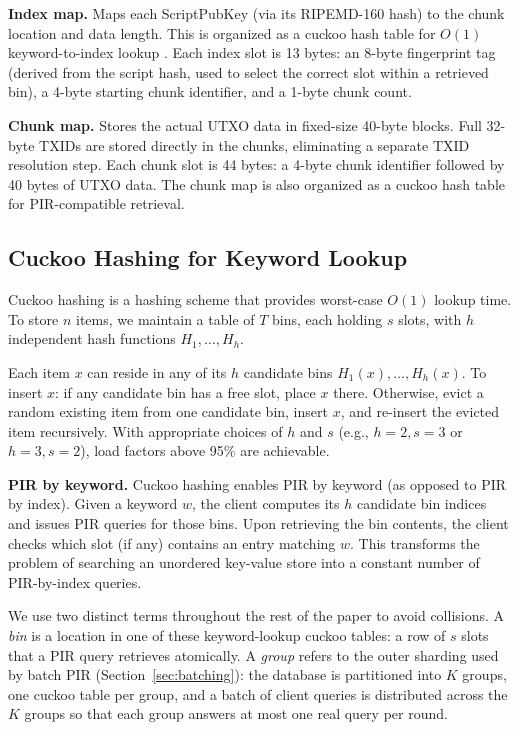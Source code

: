 \textbf{Index map.} Maps each ScriptPubKey (via its RIPEMD-160 hash) to the chunk location and data length. This is organized as a cuckoo hash table for $O(1)$ keyword-to-index lookup \cite{PR01}. Each index slot is 13 bytes: an 8-byte fingerprint tag (derived from the script hash, used to select the correct slot within a retrieved bin), a 4-byte starting chunk identifier, and a 1-byte chunk count.

\textbf{Chunk map.} Stores the actual UTXO data in fixed-size 40-byte blocks. Full 32-byte TXIDs are stored directly in the chunks, eliminating a separate TXID resolution step. Each chunk slot is 44 bytes: a 4-byte chunk identifier followed by 40 bytes of UTXO data. The chunk map is also organized as a cuckoo hash table for PIR-compatible retrieval.

\subsection{Cuckoo Hashing for Keyword Lookup}

Cuckoo hashing \cite{PR01} is a hashing scheme that provides worst-case $O(1)$ lookup time. To store $n$ items, we maintain a table of $T$ bins, each holding $s$ slots, with $h$ independent hash functions $H_1, \ldots, H_h$.

Each item $x$ can reside in any of its $h$ candidate bins $H_1(x), \ldots, H_h(x)$. To insert $x$: if any candidate bin has a free slot, place $x$ there. Otherwise, evict a random existing item from one candidate bin, insert $x$, and re-insert the evicted item recursively. With appropriate choices of $h$ and $s$ (e.g., $h{=}2, s{=}3$ or $h{=}3, s{=}2$), load factors above 95\% are achievable.

\textbf{PIR by keyword.} Cuckoo hashing enables PIR by keyword (as opposed to PIR by index). Given a keyword $w$, the client computes its $h$ candidate bin indices and issues PIR queries for those bins. Upon retrieving the bin contents, the client checks which slot (if any) contains an entry matching $w$. This transforms the problem of searching an unordered key-value store into a constant number of PIR-by-index queries.

We use two distinct terms throughout the rest of the paper to avoid collisions. A \emph{bin} is a location in one of these keyword-lookup cuckoo tables: a row of $s$ slots that a PIR query retrieves atomically. A \emph{group} refers to the outer sharding used by batch PIR (Section~\ref{sec:batching}): the database is partitioned into $K$ groups, one cuckoo table per group, and a batch of client queries is distributed across the $K$ groups so that each group answers at most one real query per round.

